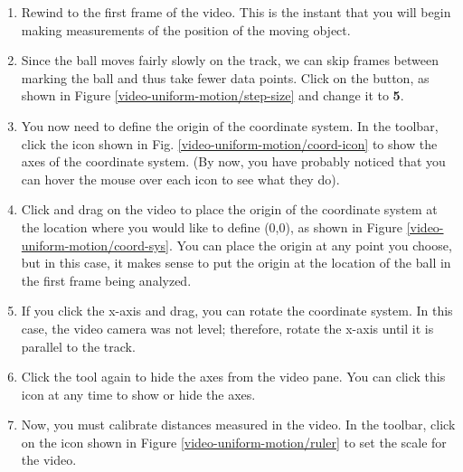 \begin{enumerate}
	\item Rewind to the first frame of the video. This is the instant that you will begin making measurements of the position of the moving object.
	
	\item Since the ball moves fairly slowly on the track, we can skip frames between marking the ball and thus take fewer data points. Click on the  button, as shown in Figure \ref{video-uniform-motion/step-size} and change it to {\bf 5}.
	
	
	\item You now need to define the origin of the coordinate system. In the toolbar, click the  icon shown in Fig. \ref{video-uniform-motion/coord-icon} to show the axes of the coordinate system. (By now, you have probably noticed that you can hover the mouse over each icon to see what they do).
	

	\item Click and drag on the video to place the origin of the coordinate system at the location where you would like to define (0,0), as shown in Figure \ref{video-uniform-motion/coord-sys}. You can place the origin at any point you choose, but in this case, it makes sense to put the origin at the location of the ball in the first frame being analyzed. 
		
	
	\item If you click the x-axis and drag, you can rotate the coordinate system. In this case, the video camera was not level; therefore, rotate the x-axis until it is parallel to the track.
	
	\item Click the  tool again to hide the axes from the video pane. You can click this icon at any time to show or hide the axes.

	\item Now, you must calibrate distances measured in the video. In the toolbar, click on the  icon shown in Figure \ref{video-uniform-motion/ruler} to set the scale for the video.
		


\end{enumerate}
